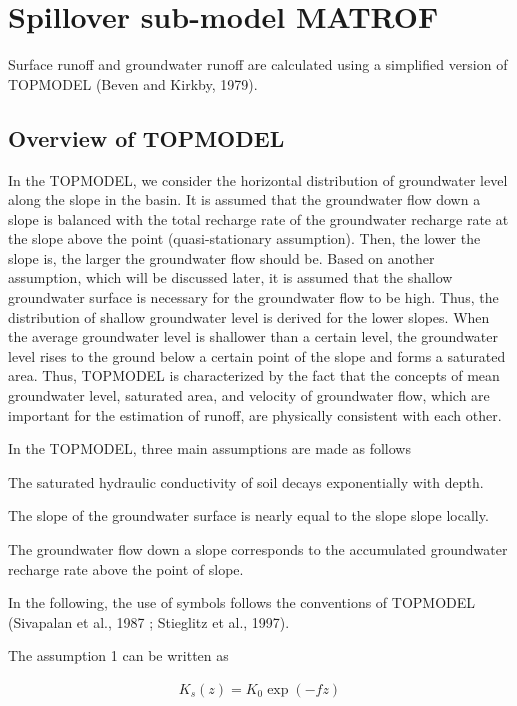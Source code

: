 \hypertarget{spillover-sub-model-matrof}{%
\section{Spillover sub-model MATROF}\label{spillover-sub-model-matrof}}

Surface runoff and groundwater runoff are calculated using a simplified
version of TOPMODEL (Beven and Kirkby, 1979).

\hypertarget{overview-of-topmodel}{%
\subsection{Overview of TOPMODEL}\label{overview-of-topmodel}}

In the TOPMODEL, we consider the horizontal distribution of groundwater
level along the slope in the basin. It is assumed that the groundwater
flow down a slope is balanced with the total recharge rate of the
groundwater recharge rate at the slope above the point (quasi-stationary
assumption). Then, the lower the slope is, the larger the groundwater
flow should be. Based on another assumption, which will be discussed
later, it is assumed that the shallow groundwater surface is necessary
for the groundwater flow to be high. Thus, the distribution of shallow
groundwater level is derived for the lower slopes. When the average
groundwater level is shallower than a certain level, the groundwater
level rises to the ground below a certain point of the slope and forms a
saturated area. Thus, TOPMODEL is characterized by the fact that the
concepts of mean groundwater level, saturated area, and velocity of
groundwater flow, which are important for the estimation of runoff, are
physically consistent with each other.

In the TOPMODEL, three main assumptions are made as follows

The saturated hydraulic conductivity of soil decays exponentially with
depth.

The slope of the groundwater surface is nearly equal to the slope slope
locally.

The groundwater flow down a slope corresponds to the accumulated
groundwater recharge rate above the point of slope.

In the following, the use of symbols follows the conventions of TOPMODEL
(Sivapalan et al., 1987 ; Stieglitz et al., 1997).

The assumption 1 can be written as

\begin{eqnarray}
 K_s(z) = K_0 \exp (-f z)
\end{eqnarray}

